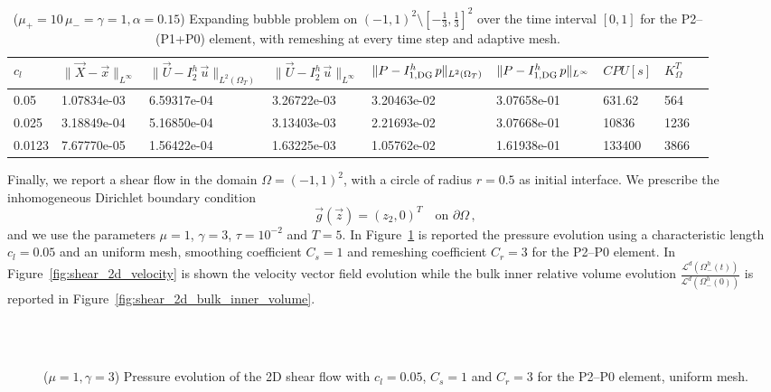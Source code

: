 \documentclass[a4paper,12pt,onecolumn]{article}
\newcommand{\errorXx}{\|\vec{X} - \vec{x}\|_{L^\infty}}
\newcommand{\LerrorUu}[1]{\|\vec U - I^h_{#1}\,\vec u\|_{L^2(\Omega_T)}}
\newcommand{\errorUu}[1]{\|\vec U - I^h_{#1}\,\vec u\|_{L^\infty}}
\newcommand{\errorPp}[1]{\|P - I^h_{#1}\,p\|_{L^\infty}}
\newcommand{\LerrorPp}[1]{\|P - I^h_{#1}\,p\|_{L^2(\Omega_T)}}
\begin{document}
\begin{table}
 \center
\begin{tabular}{llHlHllll}
\hline
$c_l$ & $\errorXx$ & $\LerrorUu2$ & $\errorUu2$ & $\LerrorPp{1,\rm{DG}}$ & $\errorPp{1,\rm{DG}}$ & $CPU[s]$ & $K_\Omega^T$\\
 & 1.07834e-03 & 6.59317e-04 & 3.26722e-03 & 3.20463e-02 & 3.07658e-01 & 631.62 & 564\\
0.025 & 3.18849e-04 & 5.16850e-04 & 3.13403e-03 & 2.21693e-02 & 3.07668e-01 & 10836 & 1236\\
0.0123 & 7.67770e-05 & 1.56422e-04 & 1.63225e-03 & 1.05762e-02 & 1.61938e-01 & 133400 & 3866\\
\hline
\end{tabular}
\caption{($\mu_+ = 10\,\mu_- = \gamma = 1,\alpha = 0.15$) Expanding bubble problem on $(-1,1)^2\setminus[-\frac{1}{3},\frac{1}{3}]^2$ over the time interval $[0,1]$ for the P2--(P1+P0) element, with remeshing at every time step and adaptive mesh.}
\label{tab:expandingbubble2Dp2p1p0adaptive}
\end{table}

Finally, we report a shear flow in the domain $\Omega=(-1,1)^2$, with a circle of radius $r=0.5$ as initial interface. We prescribe the inhomogeneous Dirichlet boundary condition
\begin{equation*}
\vec g(\vec z)=(z_2,0)^T\quad \mbox{on }\partial\Omega\,,
\end{equation*}
and we use the parameters $\mu=1$, $\gamma=3$, $\tau=10^{-2}$ and $T=5$. In Figure~\ref{fig:shear_2d} is reported the pressure evolution using a characteristic length $c_l=0.05$ and an uniform mesh, smoothing coefficient $C_s=1$ and remeshing coefficient $C_r=3$ for the P2--P0 element. In Figure~\ref{fig:shear_2d_velocity} is shown the velocity vector field evolution while the bulk inner relative volume evolution $\frac{\mathcal{L}^d(\Omega^h_-(t))}{\mathcal{L}^d(\Omega^h_-(0))}$ is reported in Figure~\ref{fig:shear_2d_bulk_inner_volume}.
\begin{figure}[htbp]
  \centering
  \quad
  \\
  \quad
  \\
  \caption{($\mu=1,\gamma=3$) Pressure evolution of the 2D shear flow with $c_l=0.05$, $C_s=1$ and $C_r=3$ for the P2--P0 element, uniform mesh.}
  \label{fig:shear_2d}
\end{figure}
\end{document}
